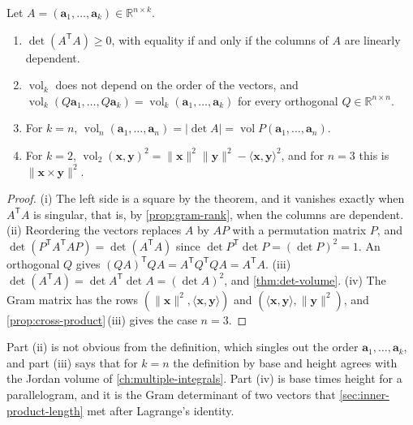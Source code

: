 \begin{corollary}
\label{cor:k-volume}
Let $A=(\mathbf a_1,\ldots,\mathbf a_k)\in\mathbb R^{n\times k}$.
\begin{enumerate}
\item $\det(A^{\mathsf T}A)\ge0$, with equality if and only if the columns of $A$ are linearly dependent.
\item $\operatorname{vol}_k$ does not depend on the order of the vectors, and $\operatorname{vol}_k(Q\mathbf a_1,\ldots,Q\mathbf a_k)=\operatorname{vol}_k(\mathbf a_1,\ldots,\mathbf a_k)$ for every orthogonal $Q\in\mathbb R^{n\times n}$.
\item For $k=n$, $\operatorname{vol}_n(\mathbf a_1,\ldots,\mathbf a_n)=|\det A|=\operatorname{vol}P(\mathbf a_1,\ldots,\mathbf a_n)$.
\item For $k=2$, $\operatorname{vol}_2(\mathbf x,\mathbf y)^2=\|\mathbf x\|^2\|\mathbf y\|^2-\langle\mathbf x,\mathbf y\rangle^2$, and for $n=3$ this is $\|\mathbf x\times\mathbf y\|^2$.
\end{enumerate}
\end{corollary}

\begin{proof}
(i) The left side is a square by the theorem, and it vanishes exactly when $A^{\mathsf T}A$ is singular, that is, by \cref{prop:gram-rank}, when the columns are dependent. (ii) Reordering the vectors replaces $A$ by $AP$ with a permutation matrix $P$, and $\det(P^{\mathsf T}A^{\mathsf T}AP)=\det(A^{\mathsf T}A)$ since $\det P^{\mathsf T}\det P=(\det P)^2=1$. An orthogonal $Q$ gives $(QA)^{\mathsf T}QA=A^{\mathsf T}Q^{\mathsf T}QA=A^{\mathsf T}A$. (iii) $\det(A^{\mathsf T}A)=\det A^{\mathsf T}\det A=(\det A)^2$, and \cref{thm:det-volume}. (iv) The Gram matrix has the rows $(\|\mathbf x\|^2,\langle\mathbf x,\mathbf y\rangle)$ and $(\langle\mathbf x,\mathbf y\rangle,\|\mathbf y\|^2)$, and \cref{prop:cross-product}\,(iii) gives the case $n=3$.
\end{proof}

Part (ii) is not obvious from the definition, which singles out the order $\mathbf a_1,\ldots,\mathbf a_k$, and part (iii) says that for $k=n$ the definition by base and height agrees with the Jordan volume of \cref{ch:multiple-integrals}. Part (iv) is base times height for a parallelogram, and it is the Gram determinant of two vectors that \cref{sec:inner-product-length} met after Lagrange's identity.

